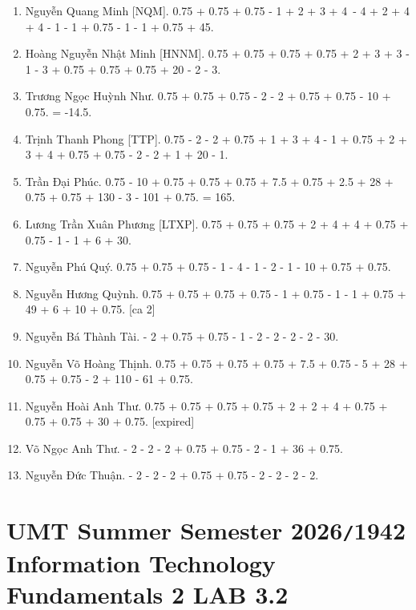 \documentclass{article}
\begin{document}
\begin{enumerate}
	\item {\sc Nguyễn Quang Minh [NQM].} 0.75 + 0.75 + 0.75 - 1 + 2 + 3 + 4 - 4 + 2 + 4 + 4 - 1 - 1 + 0.75 - 1 - 1 + 0.75 + 45.
	\item {\sc Hoàng Nguyễn Nhật Minh [HNNM].} 0.75 + 0.75 + 0.75 + 0.75 + 2 + 3 + 3 - 1 - 3 + 0.75 + 0.75 + 0.75 + 20 - 2 - 3.
	\item {\sc Trương Ngọc Huỳnh Như.} 0.75 + 0.75 + 0.75 - 2 - 2 + 0.75 + 0.75 - 10 + 0.75. = -14.5.
	\item {\sc Trịnh Thanh Phong [TTP].} 0.75 - 2 - 2 + 0.75 + 1 + 3 + 4 - 1 + 0.75 + 2 + 3 + 4 + 0.75 + 0.75 - 2 - 2 + 1 + 20 - 1.
	\item {\sc Trần Đại Phúc.} 0.75 - 10 + 0.75 + 0.75 + 0.75 + 7.5 + 0.75 + 2.5 + 28 + 0.75 + 0.75 + 130 - 3 - 101 + 0.75. = 165.
	\item {\sc Lương Trần Xuân Phương [LTXP].} 0.75 + 0.75 + 0.75 + 2 + 4 + 4 + 0.75 + 0.75 - 1 - 1 + 6 + 30.
	\item {\sc Nguyễn Phú Quý.} 0.75 + 0.75 + 0.75 - 1 - 4 - 1 - 2 - 1 - 10 + 0.75 + 0.75.
	\item {\sc Nguyễn Hương Quỳnh.} 0.75 + 0.75 + 0.75 + 0.75 - 1 + 0.75 - 1 - 1 + 0.75 + 49 + 6 + 10 + 0.75. [ca 2]
	\item {\sc Nguyễn Bá Thành Tài.} - 2 + 0.75 + 0.75 - 1 - 2 - 2 - 2 - 2 - 30.
	\item {\sc Nguyễn Võ Hoàng Thịnh.} 0.75 + 0.75 + 0.75 + 0.75 + 7.5 + 0.75 - 5 + 28 + 0.75 + 0.75 - 2 + 110 - 61 + 0.75.
	\item {\sc Nguyễn Hoài Anh Thư.} 0.75 + 0.75 + 0.75 + 0.75 + 2 + 2 + 4 + 0.75 + 0.75 + 0.75 + 30 + 0.75. [expired]
	\item {\sc Võ Ngọc Anh Thư.} - 2 - 2 - 2 + 0.75 + 0.75 - 2 - 1 + 36 + 0.75.
	\item {\sc Nguyễn Đức Thuận.} - 2 - 2 - 2 + 0.75 + 0.75 - 2 - 2 - 2 - 2.
\end{enumerate}


\section{UMT Summer Semester 2026{\tt/}1942 Information Technology Fundamentals 2 LAB 3.2}
\end{document}
